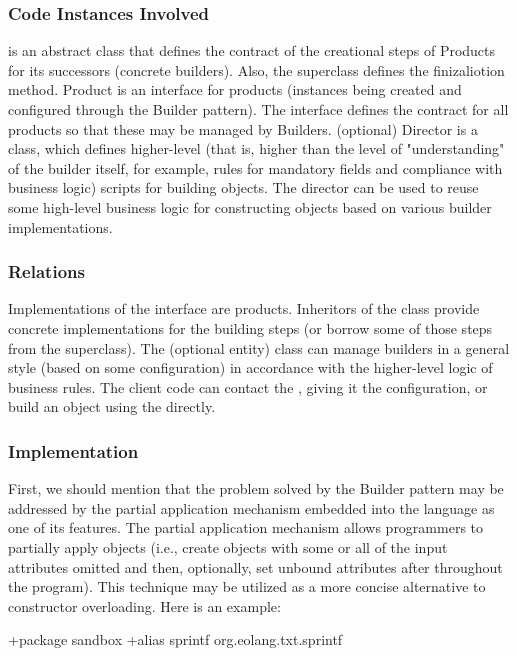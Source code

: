 \documentclass[12pt]{book}
\begin{document}
{{\subsubsection{Code Instances Involved}
 is an abstract class that defines the contract of the creational steps of Products for its successors (concrete builders). Also, the  superclass defines the finizaliotion method. 
Product is an interface for products (instances being created and configured through the Builder pattern). The interface defines the contract for all products so that these may be managed by Builders.
(optional) Director is a class, which defines higher-level (that is, higher than the level of "understanding" of the builder itself, for example, rules for mandatory fields and compliance with business logic) scripts for building objects. The director can be used to reuse some high-level business logic for constructing objects based on various builder implementations.

\subsubsection{Relations}
Implementations of the  interface are products. Inheritors of the  class provide concrete implementations for the building steps (or borrow some of those steps from the superclass). The  (optional entity) class can manage builders in a general style (based on some configuration) in accordance with the higher-level logic of business rules. The client code can contact the , giving it the configuration, or build an object using the  directly.

\subsubsection{Implementation}
First, we should mention that the problem solved by the Builder pattern may be addressed by the partial application mechanism embedded into the language as one of its features. The partial application mechanism allows programmers to partially apply objects (i.e., create objects with some or all of the input attributes omitted and then, optionally, set unbound attributes after throughout the program). This technique may be utilized as a more concise alternative to constructor overloading. Here is an example:
\begin{ffcode}
+package sandbox
+alias sprintf org.eolang.txt.sprintf


\end{ffcode}}}
\end{document}

